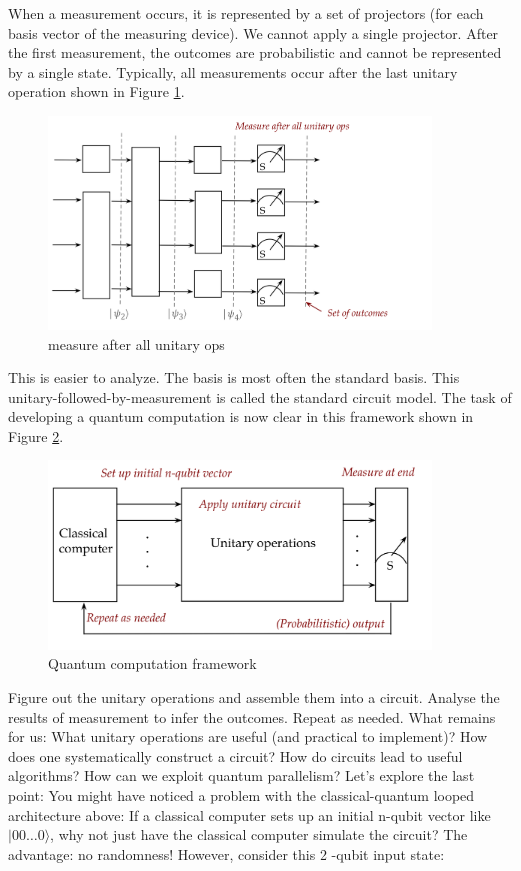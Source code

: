 \documentclass[main.tex]{subfiles}
\begin{document}
    When a measurement occurs, it is represented by a set of projectors (for each basis vector of the measuring device). We cannot apply a single projector. After the first measurement, the outcomes are probabilistic and cannot be represented by a single state. Typically, all measurements occur after the last unitary operation shown in Figure \ref{fig:16unitary7}.
    
    \begin{figure}
        \centering
        \includegraphics[width=4in]{notes/figs/n07/16unitary7.png}
        \caption{measure after all unitary ops}
        \label{fig:16unitary7}
    \end{figure}
    
    This is easier to analyze. The basis is most often the standard basis. This unitary-followed-by-measurement is called the standard circuit model. The task of developing a quantum computation is now clear in this framework shown in Figure \ref{fig:17unitary8}.
    
    \begin{figure}
        \centering
        \includegraphics[width=4in]{notes/figs/n07/17unitary8.png}
        \caption{Quantum computation framework}
        \label{fig:17unitary8}
    \end{figure}
    
    Figure out the unitary operations and assemble them into a circuit. Analyse the results of measurement to infer the outcomes. Repeat as needed. What remains for us: What unitary operations are useful (and practical to implement)? How does one systematically construct a circuit? How do circuits lead to useful algorithms? How can we exploit quantum parallelism? Let's explore the last point: You might have noticed a problem with the classical-quantum looped architecture above: If a classical computer sets up an initial n-qubit vector like $|00 \ldots 0\rangle$, why not just have the classical computer simulate the circuit? The advantage: no randomness! However, consider this 2 -qubit input state:
    
\end{document}
